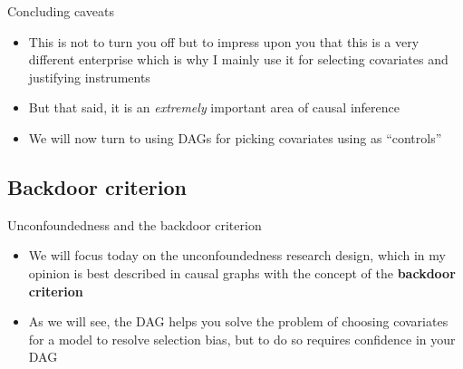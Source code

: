 \documentclass{beamer}
\begin{document}
\begin{frame}{Concluding caveats}

	\begin{itemize}
	\item This is not to turn you off but to impress upon you that this is a very different enterprise which is why I mainly use it for selecting covariates and justifying instruments
	\item But that said, it is an \emph{extremely} important area of causal inference
	\item We will now turn to using DAGs for picking covariates using as ``controls''
	\end{itemize}

\end{frame}






\subsection{Backdoor criterion}

\begin{frame}{Unconfoundedness and the backdoor criterion}

  \begin{itemize}

    \item We will focus today on the unconfoundedness research design, which in my opinion is best described in causal graphs with the concept of the \textbf{backdoor criterion}
    \item As we will see, the DAG helps you solve the problem of choosing covariates for a model to resolve selection bias, but to do so requires confidence in your DAG
  \end{itemize}

\end{frame}
\end{document}
